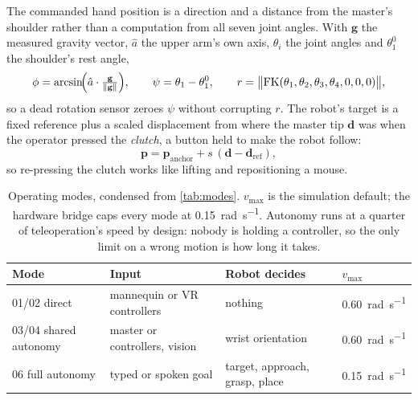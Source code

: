 The commanded hand position is a direction and a distance from the master's
shoulder rather than a computation from all seven joint angles. With
$\mathbf{g}$ the measured gravity vector, $\hat{a}$ the upper arm's own axis,
$\theta_i$ the joint angles and $\theta_1^0$ the shoulder's rest angle,
\begin{equation}
  \phi = \arcsin\!\Bigl(\hat{a}\cdot\tfrac{\mathbf{g}}{\lVert\mathbf{g}\rVert}\Bigr),\qquad
  \psi = \theta_1-\theta_1^0,\qquad
  r = \bigl\lVert \mathrm{FK}(\theta_1,\theta_2,\theta_3,\theta_4,0,0,0)\bigr\rVert,
  \label{eq:map-main}
\end{equation}
so a dead rotation sensor zeroes $\psi$ without corrupting $r$. The robot's
target is a fixed reference plus a scaled displacement from where the master
tip $\mathbf{d}$ was when the operator pressed the \emph{clutch}, a button
held to make the robot follow:
\begin{equation}
  \mathbf{p} = \mathbf{p}_{\text{anchor}} + s\,(\mathbf{d}-\mathbf{d}_{\text{ref}}),
  \label{eq:anchor-main}
\end{equation}
so re-pressing the clutch works like lifting and repositioning a mouse.

\begin{table}[htbp]
  \centering
  \small
  \caption[Operating modes]{Operating modes, condensed from \cref{tab:modes}.
  $v_{\max}$ is the simulation default; the hardware bridge caps every mode
  at \SI{0.15}{\radian\per\second}. Autonomy runs at a quarter of
  teleoperation's speed by design: nobody is holding a controller, so the
  only limit on a wrong motion is how long it takes.}
  \label{tab:modes-main}
  \begin{tabular}{@{}llll@{}}
    \toprule
    Mode & Input & Robot decides & $v_{\max}$ \\
    \midrule
    01/02 direct & mannequin or VR controllers & nothing & \SI{0.60}{\radian\per\second} \\
    03/04 shared autonomy & master or controllers, vision & wrist orientation & \SI{0.60}{\radian\per\second} \\
    06 full autonomy & typed or spoken goal & target, approach, grasp, place & \SI{0.15}{\radian\per\second} \\
    \bottomrule
  \end{tabular}
\end{table}

